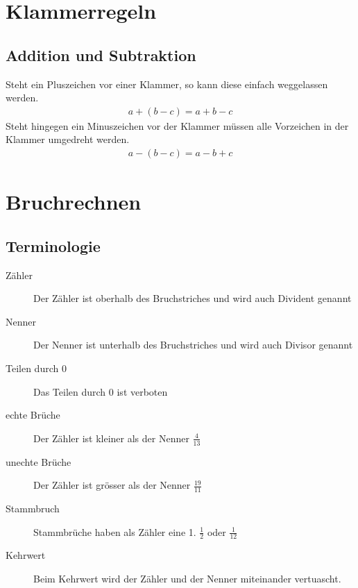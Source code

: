 


\newcommand{\SUBJECT}{Zusammenfassung}
\newcommand{\TITLE}{Math Essentials}



\section{Klammerregeln}
\subsection{Addition und Subtraktion}
Steht ein Pluszeichen vor einer Klammer, so kann diese einfach weggelassen werden.
\begin{align*}
a+ (b - c) = a + b - c
\end{align*}
Steht hingegen ein Minuszeichen vor der Klammer müssen alle Vorzeichen in der Klammer umgedreht werden.
\begin{align*}
a - (b - c) = a - b + c
\end{align*}

\section{Bruchrechnen}
\subsection{Terminologie}
\begin{description}
	\item[Zähler] Der Zähler ist oberhalb des Bruchstriches und wird auch Divident genannt
	\item[Nenner] Der Nenner ist unterhalb des Bruchstriches und wird auch Divisor genannt
	\item[Teilen durch 0] Das Teilen durch 0 ist verboten
	\item[echte Brüche] Der Zähler ist kleiner als der Nenner $\frac{4}{13}$
 	\item[unechte Brüche] Der Zähler ist grösser als der Nenner $\frac{19}{11}$
 	\item[Stammbruch] Stammbrüche haben als Zähler eine 1. $\frac{1}{2}$ oder $\frac{1}{12}$
 	\item[Kehrwert] Beim Kehrwert wird der Zähler und der Nenner miteinander vertuascht.
\end{description}

